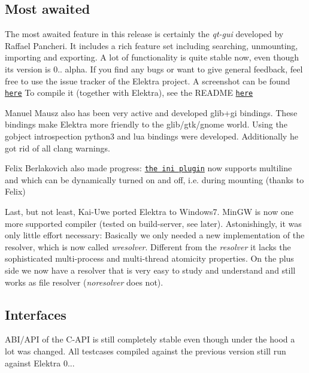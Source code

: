 \subsection*{Most awaited}

The most awaited feature in this release is certainly the {\itshape qt-\/gui} developed by Raffael Pancheri. It includes a rich feature set including searching, unmounting, importing and exporting. A lot of functionality is quite stable now, even though its version is 0.. alpha. If you find any bugs or want to give general feedback, feel free to use the issue tracker of the Elektra project. A screenshot can be found \href{https://github.com/ElektraInitiative/libelektra/blob/master/doc/images/screenshot-qt-gui.png}{\tt here} To compile it (together with Elektra), see the R\+E\+A\+D\+M\+E \href{https://github.com/ElektraInitiative/libelektra/tree/master/src/tools/qt-gui}{\tt here}

Manuel Mausz also has been very active and developed glib+gi bindings. These bindings make Elektra more friendly to the glib/gtk/gnome world. Using the gobject introspection python3 and lua bindings were developed. Additionally he got rid of all clang warnings.

Felix Berlakovich also made progress\+: \href{https://github.com/ElektraInitiative/libelektra/tree/master/src/plugins/ini}{\tt the ini plugin} now supports multiline and which can be dynamically turned on and off, i.\+e. during mounting (thanks to Felix)

Last, but not least, Kai-\/\+Uwe ported Elektra to Windows7. Min\+G\+W is now one more supported compiler (tested on build-\/server, see later). Astonishingly, it was only little effort necessary\+: Basically we only needed a new implementation of the resolver, which is now called {\itshape wresolver}. Different from the {\itshape resolver} it lacks the sophisticated multi-\/process and multi-\/thread atomicity properties. On the plus side we now have a resolver that is very easy to study and understand and still works as file resolver ({\itshape noresolver} does not).

\subsection*{Interfaces}

A\+B\+I/\+A\+P\+I of the C-\/\+A\+P\+I is still completely stable even though under the hood a lot was changed. All testcases compiled against the previous version still run against Elektra 0...

